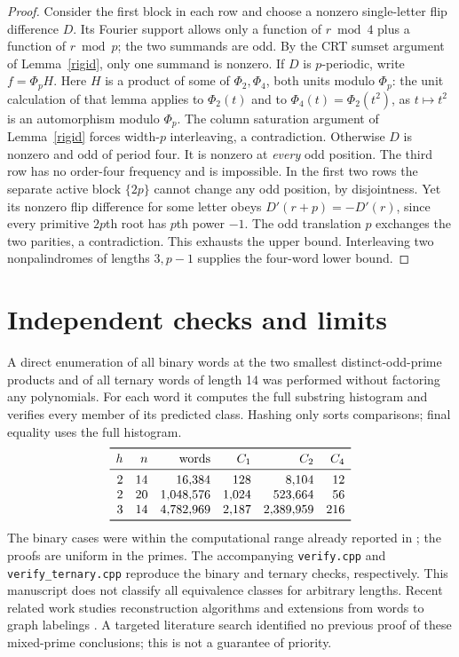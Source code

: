 \documentclass[11pt]{article}
\begin{document}
\begin{proof}
Consider the first block in each row and choose a nonzero single-letter flip difference \(D\). Its Fourier support allows only a function of \(r\bmod4\) plus a function of \(r\bmod p\); the two summands are odd. By the CRT sumset argument of Lemma~\ref{rigid}, only one summand is nonzero. If \(D\) is \(p\)-periodic, write \(f=\Phi_p H\). Here \(H\) is a product of some of \(\Phi_2,\Phi_4\), both units modulo \(\Phi_p\): the unit calculation of that lemma applies to \(\Phi_2(t)\) and to \(\Phi_4(t)=\Phi_2(t^2)\), as \(t\mapsto t^2\) is an automorphism modulo \(\Phi_p\). The column saturation argument of Lemma~\ref{rigid} forces width-\(p\) interleaving, a contradiction. Otherwise \(D\) is nonzero and odd of period four. It is nonzero at \emph{every} odd position. The third row has no order-four frequency and is impossible. In the first two rows the separate active block \(\{2p\}\) cannot change any odd position, by disjointness. Yet its nonzero flip difference for some letter obeys \(D'(r+p)=-D'(r)\), since every primitive \(2p\)th root has \(p\)th power \(-1\). The odd translation \(p\) exchanges the two parities, a contradiction. This exhausts the upper bound. Interleaving two nonpalindromes of lengths \(3,p-1\) supplies the four-word lower bound.
\end{proof}

\section*{Independent checks and limits}
A direct enumeration of all binary words at the two smallest distinct-odd-prime products and of all ternary words of length 14 was performed without factoring any polynomials. For each word it computes the full substring histogram and verifies every member of its predicted class. Hashing only sorts comparisons; final equality uses the full histogram.
\[
\begin{array}{rrrrrr}\toprule
h&n&\text{words}&C_1&C_2&C_4\\\midrule
2&14&16{,}384&128&8{,}104&12\\
2&20&1{,}048{,}576&1{,}024&523{,}664&56\\
3&14&4{,}782{,}969&2{,}187&2{,}389{,}959&216\\\bottomrule
\end{array}
\]
The binary cases were within the computational range already reported in \cite{admop}; the proofs are uniform in the primes. The accompanying \texttt{verify.cpp} and \texttt{verify\_ternary.cpp} reproduce the binary and ternary checks, respectively. This manuscript does not classify all equivalence classes for arbitrary lengths. Recent related work studies reconstruction algorithms \cite{alg} and extensions from words to graph labelings \cite{graph}. A targeted literature search identified no previous proof of these mixed-prime conclusions; this is not a guarantee of priority.
\end{document}
